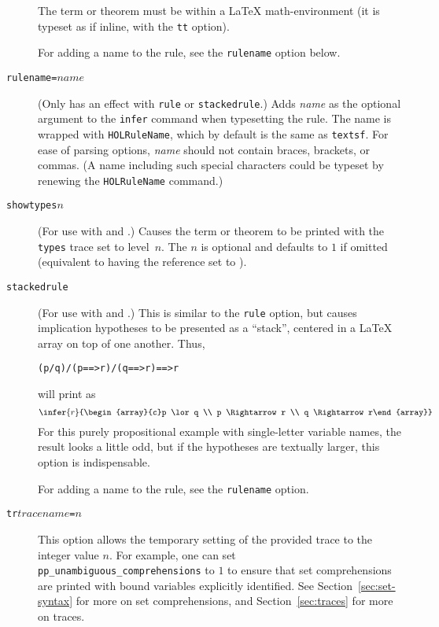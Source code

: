 \begin{description}
The term or theorem must be within a \LaTeX{} math-environment (it is typeset as if inline, with the \texttt{tt} option).

For adding a name to the rule, see the \texttt{rulename} option below.

\item[\texttt{rulename=}$\mathit{name}$] (Only has an effect with \texttt{rule} or \texttt{stackedrule}.)
Adds \textit{name} as the optional argument to the \texttt{\bs{}infer} command when typesetting the rule.
The name is wrapped with \texttt{\bs{}HOLRuleName}, which by default is the same as \texttt{\bs{}textsf}.
For ease of parsing options, \textit{name} should not contain braces, brackets, or commas.
(A name including such special characters could be typeset by renewing the \texttt{\bs{}HOLRuleName} command.)

\item[\texttt{showtypes}$n$] (For use with \holthm{} and \holtm.)
%
Causes the term or theorem to be printed with the \texttt{types} trace set to level~$n$.
The $n$ is optional and defaults to $1$ if omitted (equivalent to having the  reference set to ).

\item[\texttt{stackedrule}] (For use with \holthm{} and \holtm.)
This is similar to the \texttt{rule} option, but causes implication hypotheses to be presented as a ``stack'', centered in a \LaTeX{} array on top of one another.
Thus,
\begin{alltt}
   (p \bs{}/ q) /\bs{} (p ==> r) /\bs{} (q ==> r) ==> r
\end{alltt}
will print as
\[
\infer{r}{\begin{array}{c}p \lor q \\ p \Rightarrow r \\ q \Rightarrow r\end{array}}
\]
For this purely propositional example with single-letter variable names, the result looks a little odd, but if the hypotheses are textually larger, this option is indispensable.

For adding a name to the rule, see the \texttt{rulename} option.

\item[\texttt{tr\apost}$\mathit{tracename}$\texttt{\apost=}$n$]
This option allows the temporary setting of the provided trace to the integer value $n$.
For example, one can set \texttt{pp\_unambiguous\_comprehensions} to $1$ to ensure that set comprehensions are printed with bound variables explicitly identified.
See Section~\ref{sec:set-syntax} for more on set comprehensions, and Section~\ref{sec:traces} for more on traces.


\end{description}
